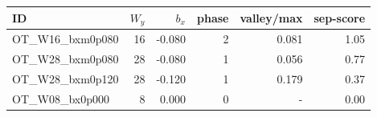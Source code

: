 \begin{tabular}{lrrrrr}
\toprule
ID & $W_y$ & $b_x$ & phase & valley/max & sep-score \\
\midrule
OT\_W16\_bxm0p080 & 16 & -0.080 & 2 & 0.081 & 1.05 \\
OT\_W28\_bxm0p080 & 28 & -0.080 & 1 & 0.056 & 0.77 \\
OT\_W28\_bxm0p120 & 28 & -0.120 & 1 & 0.179 & 0.37 \\
OT\_W08\_bx0p000 & 8 & 0.000 & 0 & - & 0.00 \\
\bottomrule
\end{tabular}
